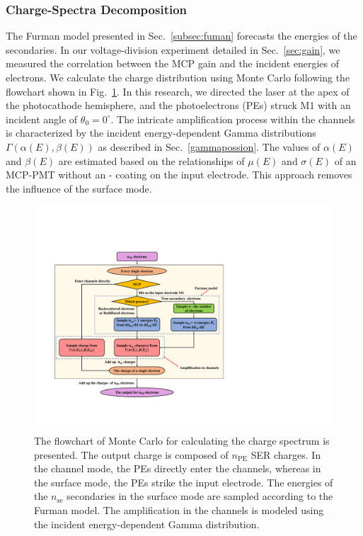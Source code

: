 \subsubsection{Charge-Spectra Decomposition}\label{sec:convolution}
The Furman model presented in Sec.~\ref{subsec:fuman} forecasts the energies of the secondaries. In our voltage-division experiment detailed in Sec.~\ref{sec:gain}, we measured the correlation between the MCP gain and the incident energies of electrons. We calculate the charge distribution using Monte Carlo following the flowchart shown in Fig.~\ref{fig:process}. In this research, we directed the laser at the apex of the photocathode hemisphere, and the photoelectrons (PEs) struck M1 with an incident angle of $\theta_0 = 0^\circ$. The intricate amplification process within the channels is characterized by the incident energy-dependent Gamma distributions $\varGamma(\alpha(E), \beta(E))$ as described in Sec.~\ref{gammapossion}. The values of $\alpha(E)$ and $\beta(E)$ are estimated based on the relationships of $\mu(E)$ and $\sigma(E)$ of an MCP-PMT without an - coating on the input electrode. This approach removes the influence of the surface mode.
\begin{figure}[!ht]
	\centering
	\includegraphics[width=\linewidth]{PMTRelated/GTmodel/process.pdf}
	\caption{The flowchart of Monte Carlo for calculating the charge spectrum is presented. The output charge is composed of \(n_\mathrm{PE}\) SER charges. In the channel mode, the PEs directly enter the channels, whereas in the surface mode, the PEs strike the input electrode. The energies of the \(n_\mathrm{se}\) secondaries in the surface mode are sampled according to the Furman model. The amplification in the channels is modeled using the incident energy-dependent Gamma distribution.
	}
	\label{fig:process}
\end{figure}
